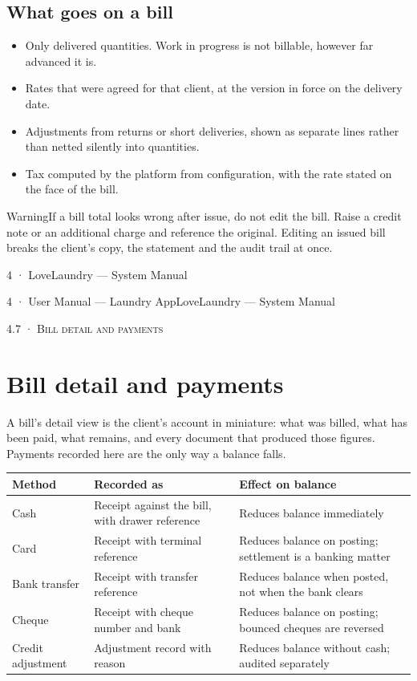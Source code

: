 \documentclass[11pt,a4paper,oneside]{book}
\begin{document}
\subsection*{What goes on a bill}
\begin{itemize}
\item Only delivered quantities. Work in progress is not billable, however far advanced it is.
\item Rates that were agreed for that client, at the version in force on the delivery date.
\item Adjustments from returns or short deliveries, shown as separate lines rather than netted silently into quantities.
\item Tax computed by the platform from configuration, with the rate stated on the face of the bill.
\end{itemize}
\begin{notebox}WarningIf a bill total looks wrong after issue, do not edit the bill. Raise a credit note or an additional charge and reference the original. Editing an issued bill breaks the client's copy, the statement and the audit trail at once.\end{notebox}
4 · LoveLaundry — System Manual

4 · User Manual — Laundry AppLoveLaundry — System Manual

\textsc{\small\color{crimson}4.7 · Bill detail and payments}\par\medskip
\section*{Bill detail and payments}
A bill's detail view is the client's account in miniature: what was billed, what has been paid, what remains, and every document that produced those figures. Payments recorded here are the only way a balance falls.

\begin{center}\small
\begin{tabularx}{\linewidth}{|X|X|X|}
\hline
\rowcolor{lightgrey}
\textbf{Method} & \textbf{Recorded as} & \textbf{Effect on balance} \\ \hline
Cash & Receipt against the bill, with drawer reference & Reduces balance immediately \\ \hline
Card & Receipt with terminal reference & Reduces balance on posting; settlement is a banking matter \\ \hline
Bank transfer & Receipt with transfer reference & Reduces balance when posted, not when the bank clears \\ \hline
Cheque & Receipt with cheque number and bank & Reduces balance on posting; bounced cheques are reversed \\ \hline
Credit adjustment & Adjustment record with reason & Reduces balance without cash; audited separately \\ \hline
\end{tabularx}
\end{center}
\end{document}
